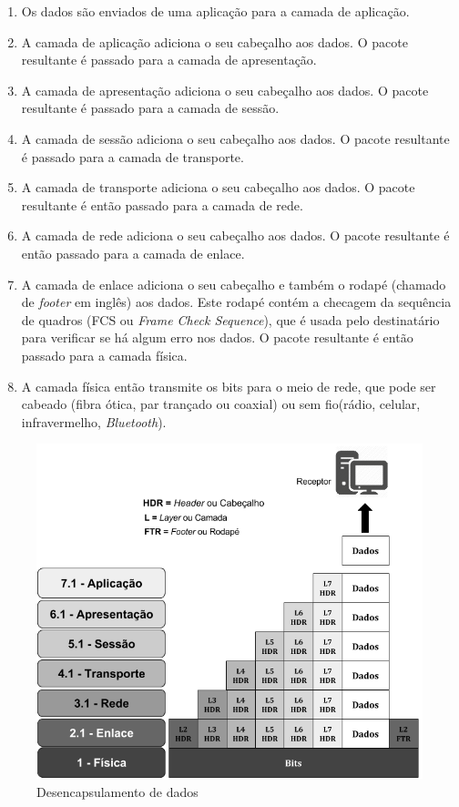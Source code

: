 \documentclass[
12pt,				%
openright,			%
oneside,			%
a4paper,			%
brazil,				%
]{abntex2}
\begin{document}
	\begin{enumerate}
		\item Os dados são enviados de uma aplicação para a camada de aplicação.
		\item A camada de aplicação adiciona o seu cabeçalho aos dados. O pacote resultante é passado para a camada de apresentação.
		\item A camada de apresentação adiciona o seu cabeçalho aos dados. O pacote resultante é passado para a camada de sessão.
		\item A camada de sessão adiciona o seu cabeçalho aos dados. O pacote resultante é passado para a camada de transporte.
		\item A camada de transporte adiciona o seu cabeçalho aos dados. O pacote resultante é então passado para a camada de rede.
		\item A camada de rede adiciona o seu cabeçalho aos dados. O pacote resultante é então passado para a camada de enlace.
		\item A camada de enlace adiciona o seu cabeçalho e também o rodapé (chamado de \textit{footer} em inglês) aos dados. Este rodapé contém a checagem da sequência de quadros (FCS ou \textit{Frame Check Sequence}), que é usada pelo destinatário para verificar se há algum erro nos dados. O pacote resultante é então passado para a camada física.
		\item A camada física então transmite os bits para o meio de rede, que pode ser cabeado (fibra ótica, par trançado ou coaxial) ou sem fio(rádio, celular, infravermelho, \textit{Bluetooth}).
	\end{enumerate}

	\begin{figure} [H]
		\centering
		\includegraphics[scale=.5]{figuras/cap2/04DesencapsulamentoDedados}
		\caption{\label{fig_4}Desencapsulamento de dados}
	\end{figure}
	
\end{document}
